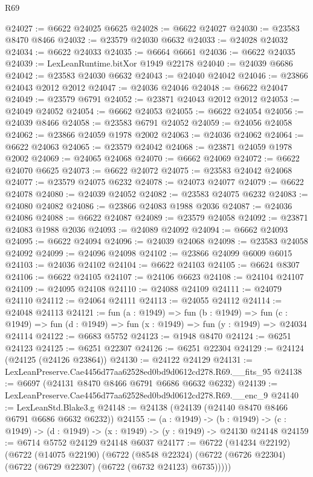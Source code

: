 \begin{lexlean}{R69}
\begin{coremodule}
{@24027 := @6622 @24025 @6625
@24028 := @6622 @24027
@24030 := @23583 @8470 @8466
@24032 := @23579 @24030 @6632
@24033 := @24028 @24032
@24034 := @6622 @24033
@24035 := @6664 @6661
@24036 := @6622 @24035
@24039 := LexLeanRuntime.bitXor @1949 @22178
@24040 := @24039 @6686
@24042 := @23583 @24030 @6632
@24043 := @24040 @24042
@24046 := @23866 @24043 @2012 @2012
@24047 := @24036 @24046
@24048 := @6622 @24047
@24049 := @23579 @6791
@24052 := @23871 @24043 @2012 @2012
@24053 := @24049 @24052
@24054 := @6662 @24053
@24055 := @6622 @24054
@24056 := @24039 @8466
@24058 := @23583 @6791 @24052
@24059 := @24056 @24058
@24062 := @23866 @24059 @1978 @2002
@24063 := @24036 @24062
@24064 := @6622 @24063
@24065 := @23579 @24042
@24068 := @23871 @24059 @1978 @2002
@24069 := @24065 @24068
@24070 := @6662 @24069
@24072 := @6622 @24070 @6625
@24073 := @6622 @24072
@24075 := @23583 @24042 @24068
@24077 := @23579 @24075 @6232
@24078 := @24073 @24077
@24079 := @6622 @24078
@24080 := @24039 @24052
@24082 := @23583 @24075 @6232
@24083 := @24080 @24082
@24086 := @23866 @24083 @1988 @2036
@24087 := @24036 @24086
@24088 := @6622 @24087
@24089 := @23579 @24058
@24092 := @23871 @24083 @1988 @2036
@24093 := @24089 @24092
@24094 := @6662 @24093
@24095 := @6622 @24094
@24096 := @24039 @24068
@24098 := @23583 @24058 @24092
@24099 := @24096 @24098
@24102 := @23866 @24099 @6009 @6015
@24103 := @24036 @24102
@24104 := @6622 @24103
@24105 := @6624 @8307
@24106 := @6622 @24105
@24107 := @24106 @6623
@24108 := @24104 @24107
@24109 := @24095 @24108
@24110 := @24088 @24109
@24111 := @24079 @24110
@24112 := @24064 @24111
@24113 := @24055 @24112
@24114 := @24048 @24113
@24121 := fun (a : @1949) =>
  fun (b : @1949) =>
  fun (c : @1949) => fun (d : @1949) => fun (x : @1949) => fun (y : @1949) => @24034 @24114
@24122 := @6683 @5752
@24123 := @1948 @8470
@24124 := @6251 @24123
@24125 := @6251 @22307
@24126 := @6251 @22304
@24129 := @24124 (@24125 (@24126 @23864))
@24130 := @24122 @24129
@24131 := LexLeanPreserve.Cae4456d77aa62528ed0bd9d0612cd278.R69.__fits_95
@24138 := @6697 (@24131 @8470 @8466 @6791 @6686 @6632 @6232)
@24139 := LexLeanPreserve.Cae4456d77aa62528ed0bd9d0612cd278.R69.__enc_9
@24140 := LexLeanStd.Blake3.g
@24148 := @24138 (@24139 (@24140 @8470 @8466 @6791 @6686 @6632 @6232))
@24155 := (a : @1949) ->
  (b : @1949) -> (c : @1949) -> (d : @1949) -> (x : @1949) -> (y : @1949) -> @24130 @24148
@24159 := @6714 @5752 @24129 @24148 @6037
@24177 := @6722
    (@14234 @22192)
    (@6722
      (@14075 @22190)
      (@6722
        (@8548 @22324)
        (@6722 (@6726 @22304) (@6722 (@6729 @22307) (@6722 (@6732 @24123) @6735)))))
}
\end{coremodule}
\end{lexlean}
